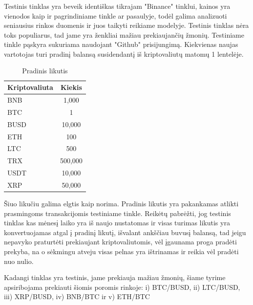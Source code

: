 \documentclass{VUMIFInfKursinis}
\begin{document}
Testinis tinklas yra beveik identiškas tikrajam "Binance" tinklui, kainos yra vienodos kaip ir pagrindiniame tinkle ar pasaulyje, todėl galima analizuoti 
seniausius rinkos duomenis ir juos taikyti reikiame modelyje. Testinis tinklas nėra toks populiarus, tad jame yra ženkliai mažiau prekiaujančių žmonių. 
Testiniame tinkle pąskyra sukuriama naudojant "Github" prisijungimą. Kiekvienas naujas vartotojas turi pradinį balansą susidendantį iš kriptovaliutų
matomų 1 lentelėje.

\begin{table}[H]\footnotesize
  \centering
  \caption{Pradinis likutis}    %
  {\begin{tabular}{|l|c|} \hline
      Kriptovaliuta & Kiekis  \\
      \hline
      BNB           & 1,000   \\
      BTC           & 1       \\
      BUSD          & 10,000  \\
      ETH           & 100     \\
      LTC           & 500     \\
      TRX           & 500,000 \\
      USDT          & 10,000  \\
      XRP           & 50,000  \\
      \hline 
    \end{tabular}}
\end{table}

Šiuo likučiu galima elgtis kaip norima. Pradinis likutis yra pakankamas atlikti prasmingoms transakcijomis testiniame tinkle. Reikėtų pabrėžti, jog testinis
tinklas kas mėnesį laiko yra iš naujo nustatomas ir visas turimas likutis yra konvertuojamas atgal į pradinį likutį, išvalant ankščiau buvusį balansą, tad jeigu
nepavyko praturtėti prekiaujant kriptovaliutomis, vėl įgaunama proga pradėti prekyba, na o sėkmingu atveju visas pelnas yra ištrinamas ir reikia vėl pradėti
nuo nulio.

Kadangi tinklas yra testinis, jame prekiauja mažiau žmonių, šiame tyrime apsiribojama prekiauti šiomis poromis rinkoje: i) BTC/BUSD, ii) LTC/BUSD, iii) XRP/BUSD,
iv) BNB/BTC ir v) ETH/BTC
\end{document}
